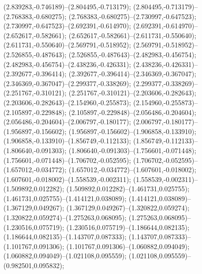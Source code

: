  (2.839283,-0.746189)--(2.804495,-0.713179);
 (2.804495,-0.713179)--(2.768383,-0.680275);
 (2.768383,-0.680275)--(2.730997,-0.647523);
 (2.730997,-0.647523)--(2.692391,-0.614970);
 (2.692391,-0.614970)--(2.652617,-0.582661);
 (2.652617,-0.582661)--(2.611731,-0.550640);
 (2.611731,-0.550640)--(2.569791,-0.518952);
 (2.569791,-0.518952)--(2.526855,-0.487643);
 (2.526855,-0.487643)--(2.482983,-0.456754);
 (2.482983,-0.456754)--(2.438236,-0.426331);
 (2.438236,-0.426331)--(2.392677,-0.396414);
 (2.392677,-0.396414)--(2.346369,-0.367047);
 (2.346369,-0.367047)--(2.299377,-0.338269);
 (2.299377,-0.338269)--(2.251767,-0.310121);
 (2.251767,-0.310121)--(2.203606,-0.282643);
 (2.203606,-0.282643)--(2.154960,-0.255873);
 (2.154960,-0.255873)--(2.105897,-0.229848);
 (2.105897,-0.229848)--(2.056486,-0.204604);
 (2.056486,-0.204604)--(2.006797,-0.180177);
 (2.006797,-0.180177)--(1.956897,-0.156602);
 (1.956897,-0.156602)--(1.906858,-0.133910);
 (1.906858,-0.133910)--(1.856749,-0.112133);
 (1.856749,-0.112133)--(1.806640,-0.091303);
 (1.806640,-0.091303)--(1.756601,-0.071448);
 (1.756601,-0.071448)--(1.706702,-0.052595);
 (1.706702,-0.052595)--(1.657012,-0.034772);
 (1.657012,-0.034772)--(1.607601,-0.018002);
 (1.607601,-0.018002)--(1.558539,-0.002311);
 (1.558539,-0.002311)--(1.509892,0.012282);
 (1.509892,0.012282)--(1.461731,0.025755);
 (1.461731,0.025755)--(1.414121,0.038089);
 (1.414121,0.038089)--(1.367129,0.049267);
 (1.367129,0.049267)--(1.320822,0.059274);
 (1.320822,0.059274)--(1.275263,0.068095);
 (1.275263,0.068095)--(1.230516,0.075719);
 (1.230516,0.075719)--(1.186644,0.082135);
 (1.186644,0.082135)--(1.143707,0.087333);
 (1.143707,0.087333)--(1.101767,0.091306);
 (1.101767,0.091306)--(1.060882,0.094049);
 (1.060882,0.094049)--(1.021108,0.095559);
 (1.021108,0.095559)--(0.982501,0.095832);
